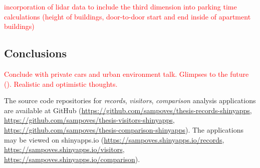 \textcolor{red}{incorporation of lidar data to include the third dimension into parking time calculations (height of buildings, door-to-door start and end inside of apartment buildings)}

\newpage
\subsection{Conclusions}
\justify


\textcolor{red}{Conclude with private cars and urban environment talk. Glimpses to the future (\cite{ElinaBrandtMatleenaLindeqvist2016}). Realistic and optimistic thoughts.}

The source code repositories for \textit{records}, \textit{visitors}, \textit{comparison} analysis applications are available at GitHub (\textcolor{blue}{\url{https://github.com/sampoves/thesis-records-shinyapps}}, \textcolor{blue}{\url{https://github.com/sampoves/thesis-visitors-shinyapps}}, \textcolor{blue}{\url{https://github.com/sampoves/thesis-comparison-shinyapps}}). The applications may be viewed on shinyapps.io (\textcolor{blue}{\url{https://sampoves.shinyapps.io/records}}, \textcolor{blue}{\url{https://sampoves.shinyapps.io/visitors}}, \textcolor{blue}{\url{https://sampoves.shinyapps.io/comparison}}).